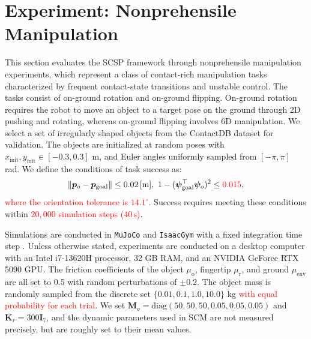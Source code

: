 \section{Experiment: Nonprehensile Manipulation}
\label{sec:experiment}
\label{sec:experiment_ii}

This section evaluates the SCSP framework through nonprehensile manipulation experiments, which represent a class of contact-rich manipulation tasks characterized by frequent contact-state transitions and unstable control. The tasks consist of on-ground rotation and on-ground flipping. On-ground rotation requires the robot to move an object to a target pose on the ground through 2D pushing and rotating, whereas on-ground flipping involves 6D manipulation. We select a set of irregularly shaped objects from the ContactDB dataset \cite{brahmbhatt2019contactdb} for validation. The objects are initialized at random poses with
$x_{\text{init}}, y_{\text{init}} \in [-0.3, 0.3]$ m,
and Euler angles 
uniformly sampled from $[-\pi, \pi]$ rad. We define the conditions of task success as:
\begin{equation}
 \left\| \boldsymbol{p}_o - \boldsymbol{p}_{\text{goal}} \right\|
\le 0.02 \,\text{[m]}, \
1 - (\boldsymbol{\psi}_{\text{goal}}^\top \boldsymbol{\psi}_o)^2
\le \textcolor{red}{0.015}, \label{eq:pose_success}
\end{equation}
\textcolor{red}{where the orientation tolerance is $14.1^\circ$.} Success requires meeting these conditions within \textcolor{red}{$20{,}000$ simulation steps ($40\,\mathrm{s}$)}.

Simulations are conducted in \texttt{MuJoCo} \cite{todorov2012mujoco} and \texttt{IsaacGym} \cite{makoviychuk2021isaac} with a fixed integration time step .    Unless otherwise stated, experiments are conducted on a desktop computer with an Intel i7-13620H processor, 32 GB RAM, and an NVIDIA GeForce RTX 5090 GPU.  The friction coefficients of the object $\mu_{\text{o}}$, fingertip $\mu_{\text{r}}$, and ground $\mu_{\text{env}}$ are all set to 0.5 with random perturbations of $\pm 0.2$. The object mass is randomly sampled from the discrete set
$\{0.01,0.1,1.0,10.0\}$ kg \textcolor{red}{with equal probability for each trial}. We set $\boldsymbol{M}_o=\text{diag}(50,50,50,0.05,0.05,0.05)$ and $\boldsymbol{K}_r=300 \boldsymbol{I}_7$, and the dynamic parameters used in SCM are not measured precisely, but are roughly set to their mean values.

